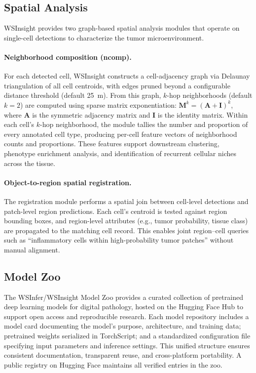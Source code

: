 \documentclass[sn-mathphys-num]{sn-jnl}%
\theoremstyle{thmstyleone}%
\theoremstyle{thmstyletwo}%
\theoremstyle{thmstylethree}%
\begin{document}
	\subsection{Spatial Analysis}
	\label{sec:spatial}
	
	WSInsight provides two graph-based spatial analysis modules that operate on single-cell detections to characterize the tumor microenvironment.
	
	\paragraph{Neighborhood composition (ncomp).}
	For each detected cell, WSInsight constructs a cell-adjacency graph via Delaunay triangulation of all cell centroids, with edges pruned beyond a configurable distance threshold (default 25~\textmu m). From this graph, $k$-hop neighborhoods (default $k{=}2$) are computed using sparse matrix exponentiation: $\mathbf{M}^k = (\mathbf{A} + \mathbf{I})^k$, where $\mathbf{A}$ is the symmetric adjacency matrix and $\mathbf{I}$ is the identity matrix. Within each cell's $k$-hop neighborhood, the module tallies the number and proportion of every annotated cell type, producing per-cell feature vectors of neighborhood counts and proportions. These features support downstream clustering, phenotype enrichment analysis, and identification of recurrent cellular niches across the tissue.
	
	\paragraph{Object-to-region spatial registration.}
	The registration module performs a spatial join between cell-level detections and patch-level region predictions. Each cell's centroid is tested against region bounding boxes, and region-level attributes (e.g., tumor probability, tissue class) are propagated to the matching cell record. This enables joint region--cell queries such as ``inflammatory cells within high-probability tumor patches'' without manual alignment.
	
	\subsection{Model Zoo}
	
	The WSInfer/WSInsight Model Zoo provides a curated collection of pretrained deep learning models for digital pathology, hosted on the Hugging Face Hub to support open access and reproducible research. Each model repository includes a model card documenting the model’s purpose, architecture, and training data; pretrained weights serialized in TorchScript; and a standardized configuration file specifying input parameters and inference settings. This unified structure ensures consistent documentation, transparent reuse, and cross-platform portability. A public registry on Hugging Face maintains all verified entries in the zoo.
\end{document}
